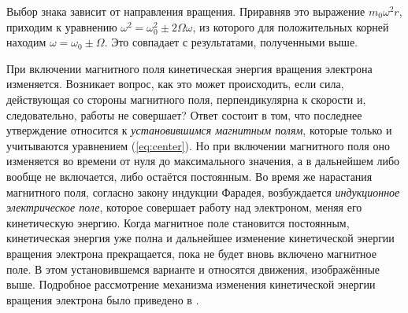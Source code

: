 \documentclass[12pt]{article}
\begin{document}
  Выбор знака зависит от направления вращения. Приравняв это выражение $m_0 \omega^2 r$, приходим к уравнению $\omega^2 = \omega_0^2 \pm 2\Omega \omega$, из которого для положительных корней находим $\omega = \omega_0 \pm \Omega$. Это совпадает с результатами, полученными выше.

  При включении магнитного поля кинетическая энергия вращения электрона изменяется. Возникает вопрос, как это может происходить, если сила, действующая со стороны магнитного поля, перпендикулярна к скорости и, следовательно, работы не совершает? Ответ состоит в том, что последнее утверждение относится к \textit{установившимся магнитным полям}, которые только и учитываются уравнением (\ref{eq:center}). Но при включении магнитного поля оно изменяется во времени от нуля до максимального значения, а в дальнейшем либо вообще не включается, либо остаётся постоянным. Во время же нарастания магнитного поля, согласно закону индукции Фарадея, возбуждается \textit{индукционное электрическое поле}, которое совершает работу над электроном, меняя его кинетическую энергию. Когда магнитное поле становится постоянным, кинетическая энергия уже полна и дальнейшее изменение кинетической энергии вращения электрона прекращается, пока не будет вновь включено магнитное поле. В этом установившемся варианте и относятся движения, изображённые выше. Подробное рассмотрение механизма изменения кинетической энергии вращения электрона было приведено в
  \cite[\S 88]{sivykhin3}.
\end{document}
